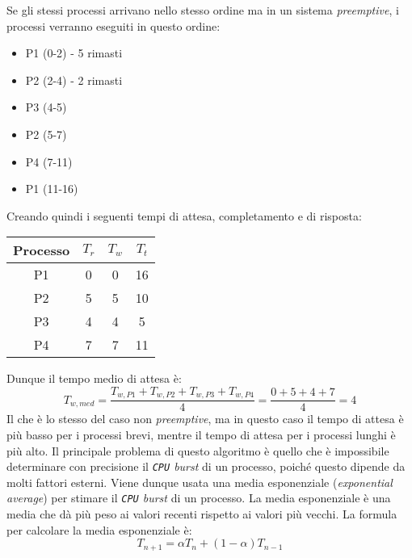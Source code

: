             Se gli stessi processi arrivano nello stesso ordine ma in un sistema \textit{preemptive}, i processi verranno eseguiti in questo ordine:
            \begin{itemize}
                \item P1 (0-2) - 5 rimasti
                \item P2 (2-4) - 2 rimasti
                \item P3 (4-5)
                \item P2 (5-7)
                \item P4 (7-11)
                \item P1 (11-16)
            \end{itemize}
            Creando quindi i seguenti tempi di attesa, completamento e di risposta:
            \begin{table}[H]
                \centering
                \begin{tabular}{|c|c|c|c|}
                    \hline
                    \textbf{Processo} & \textbf{$T_r$} & \textbf{$T_w$} & \textbf{$T_t$} \\ \hline
                    P1 & 0 & 0 & 16 \\ \hline
                    P2 & 5 & 5 & 10 \\ \hline
                    P3 & 4 & 4 & 5 \\ \hline
                    P4 & 7 & 7 & 11 \\ \hline
                \end{tabular}
            \end{table}
            Dunque il tempo medio di attesa è:
            $$
                T_{w,med} = \frac{T_{w,P1} + T_{w,P2} + T_{w,P3} + T_{w,P4}}{4} = \frac{0 + 5 + 4 + 7}{4} = 4
            $$
            Il che è lo stesso del caso non \textit{preemptive}, ma in questo caso il tempo di attesa è più basso per i processi brevi, mentre il tempo di attesa per i processi lunghi è più alto.\newline
            Il principale problema di questo algoritmo è quello che è impossibile determinare con precisione il \textit{\texttt{CPU} burst} di un processo, poiché questo dipende da molti fattori esterni. Viene dunque usata una media esponenziale (\textit{exponential average}) per stimare il \textit{\texttt{CPU} burst} di un processo. La media esponenziale è una media che dà più peso ai valori recenti rispetto ai valori più vecchi. La formula per calcolare la media esponenziale è:
            $$T_{n+1} = \alpha T_n + (1 - \alpha) T_{n-1}$$
